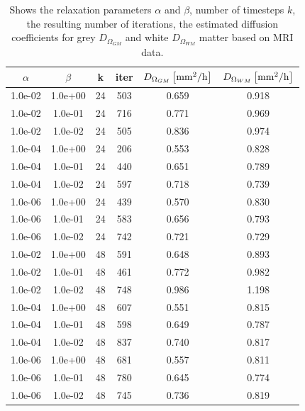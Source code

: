 \documentclass[11pt,a4paper]{article}
\begin{document}
\begin{table}
\centering
\caption{Shows the relaxation parameters $\alpha$ and $\beta$, number of timesteps $k$, the resulting number of iterations, the estimated diffusion coefficients for grey $D_{\Omega_{GM}}$ and white $D_{\Omega_{WM}}$ matter based on MRI data.}
\begin{tabular}{*{6}c}
$\alpha$ & $\beta$ & k & iter &  $ D_{\Omega_{GM}} \left[ \mathrm{mm\sp{2}/h} \right] $ & $ D_{\Omega_{WM}} \left[ \mathrm{mm\sp{2}/h} \right]$ \\
\hline
 1.0e-02 	 & 1.0e+00 	 & 24 & 503 	 & 0.659 & 0.918 \\ 
 1.0e-02 	 & 1.0e-01 	 & 24 & 716 	 & 0.771 & 0.969 \\ 
 1.0e-02 	 & 1.0e-02 	 & 24 & 505 	 & 0.836 & 0.974 \\ 
 1.0e-04 	 & 1.0e+00 	 & 24 & 206 	 & 0.553 & 0.828 \\ 
 1.0e-04 	 & 1.0e-01 	 & 24 & 440 	 & 0.651 & 0.789 \\ 
 1.0e-04 	 & 1.0e-02 	 & 24 & 597 	 & 0.718 & 0.739 \\ 
 1.0e-06 	 & 1.0e+00 	 & 24 & 439 	 & 0.570 & 0.830 \\ 
 1.0e-06 	 & 1.0e-01 	 & 24 & 583 	 & 0.656 & 0.793 \\ 
 1.0e-06 	 & 1.0e-02 	 & 24 & 742 	 & 0.721 & 0.729 \\ 
 
 1.0e-02 	 & 1.0e+00 	 & 48 & 591 	 & 0.648 & 0.893 \\ 
 1.0e-02 	 & 1.0e-01 	 & 48 & 461 	 & 0.772 & 0.982 \\ 
 1.0e-02 	 & 1.0e-02 	 & 48 & 748 	 & 0.986 & 1.198 \\ 
 1.0e-04 	 & 1.0e+00 	 & 48 & 607 	 & 0.551 & 0.815 \\ 
 1.0e-04 	 & 1.0e-01 	 & 48 & 598 	 & 0.649 & 0.787 \\ 
 1.0e-04 	 & 1.0e-02 	 & 48 & 837 	 & 0.740 & 0.817 \\
 1.0e-06 	 & 1.0e+00 	 & 48 & 681 	 & 0.557 & 0.811 \\ 
 1.0e-06 	 & 1.0e-01 	 & 48 & 780 	 & 0.645 & 0.774 \\ 
 1.0e-06 	 & 1.0e-02 	 & 48 & 745 	 & 0.736 & 0.819 \\ 



\end{tabular}
\label{Tab::Real-data}
\end{table} 
 
\end{document}
